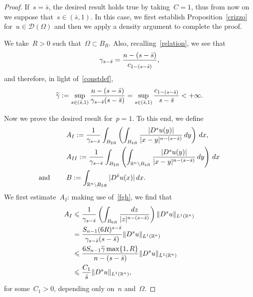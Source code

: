 \documentclass[11pt,hyp,]{nyjm}
\numberwithin{equation}{section}
\newcommand{\R}{\mathbb{R}}
\theoremstyle{remark}
\newcommand{\bs}{\Bar{s}}
\renewcommand{\leq}{\leqslant}
\renewcommand{\le}{\leqslant}
\begin{document}
		\begin{proof}
If~$s = \bar{s}$, the desired result holds true by taking~$C=1$, thus from now on
we suppose that~$s\in (\bar{s},1)$. 
In this case, we first establish Proposition~\ref{crizzo} for~$u \in \mathcal{D}(\Omega)$ and then we apply a density argument to complete the proof. 
						
			We take~$R>0$ such that~$\Omega \subset B_{R}$. Also, recalling~\eqref{relation}, we see that
			\[ \gamma_{s-\bs} = \frac{n-(s- \bs)}{c_{1-(s-\bs)}},\]
and therefore, in light of~\eqref{constdef},			
			\begin{equation}\label{fgh} \widetilde\gamma:= \sup_{ s \in (\bs,1)} \frac{n-(s- \bs)}{\gamma_{s-\bs}(s-\bs)} =
				\sup_{ s \in (\bs,1)} \frac{c_{1-(s-\bs)}}{s-\bs} < +\infty. 
				\end{equation}
					
	Now we prove the desired result for~$p=1$.
To this end, we define
	\begin{align*}
	 &A_I := \frac{1}{\gamma_{s-\bs}} \int_{B_{2R}} \left( \int_{B_{4R}} \frac{|D^su(y)|}{|x-y|^{n-(s-\bs)}} \, dy \right) \, dx, \\
	  &A_{II} := \frac{1}{\gamma_{s-\bs}} \int_{B_{2R}} \left( \int_{\R^n \setminus B_{4R}} \frac{|D^su(y)|}{|x-y|^{n-(s-\bs)}} \, dy \right) \, dx \\ {\mbox{and }}\qquad
	 &B := \int_{\R^n \setminus B_{2R}} |D^{\bar{s}} u (x)| \, dx.
	\end{align*}
	We first estimate~$A_I$: making use of~\eqref{fgh}, we find that 			
\begin{equation}\label{jeiwoytgrej768905}\begin{split}
A_I &\leq   \frac{1}{\gamma_{s-\bs}}  \left( \int_{B_{6R}} \frac{dz}{|z|^{n-(s-\bs)}} \right)\Vert D^s u \Vert_{L^1(\R^n)}\\&
= \frac{S_{n-1}(6R)^{s- \bar{s}}}{\gamma_{s-\bs}(s-\bar{s})} \Vert D^s u \Vert_{L^1(\R^n)}\\
&\le  \frac{6S_{n-1}\widetilde\gamma\max\{1,R\} }{n-(s-\bs)} \Vert D^s u \Vert_{L^1(\R^n)}\\&
\le  \frac{C_1 }{\bs} \Vert D^s u \Vert_{L^1(\R^n)},
\end{split}\end{equation} for some~$C_1>0$, depending only on~$n$ and~$\Omega$.


\end{proof}
\end{document}
